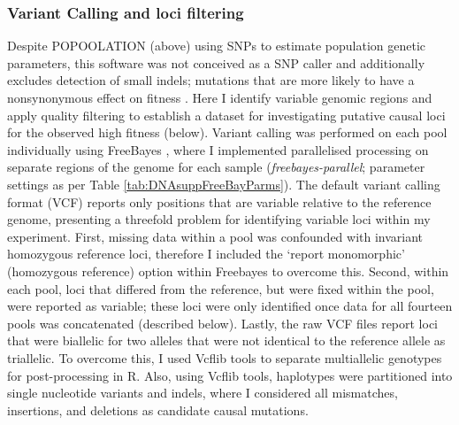 \subsubsection{Variant Calling and loci filtering}
Despite POPOOLATION (above) using SNPs to estimate population genetic parameters, this software was not conceived as a SNP caller \citep{Rain12} and additionally excludes detection of small indels; mutations that are more likely to have a nonsynonymous effect on fitness \citep{Sung16}. Here I identify variable genomic regions and apply quality filtering to establish a dataset for investigating putative causal loci for the observed high fitness (below). Variant calling was performed on each pool individually using FreeBayes \citep{Garr12}, where I implemented parallelised processing on separate regions of the genome for each sample (\textit{freebayes-parallel}; parameter settings as per Table \ref{tab:DNAsuppFreeBayParms}). The default variant calling format (VCF) reports only positions that are variable relative to the reference genome, presenting a threefold problem for identifying variable loci within my experiment. First, missing data within a pool was confounded with invariant homozygous reference loci, therefore I included the ‘report monomorphic’ (homozygous reference) option within Freebayes to overcome this. Second, within each pool, loci that differed from the reference, but were fixed within the pool, were reported as variable; these loci were only identified once data for all fourteen pools was concatenated (described below). Lastly, the raw VCF files report loci that were biallelic for two alleles that were not identical to the reference allele as triallelic. To overcome this, I used Vcflib tools \citep{Garr16} to separate multiallelic genotypes for post-processing in R. Also, using Vcflib tools, haplotypes were partitioned into single nucleotide variants and indels, where I considered all mismatches, insertions, and deletions as candidate causal mutations. \par

